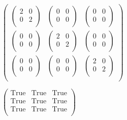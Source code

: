 \documentclass{article}
\begin{document}
\begin{doublespace}
\noindent\(\left(
\begin{array}{ccc}
 \left(
\begin{array}{cc}
 2 & 0 \\
 0 & 2 \\
\end{array}
\right) & \left(
\begin{array}{cc}
 0 & 0 \\
 0 & 0 \\
\end{array}
\right) & \left(
\begin{array}{cc}
 0 & 0 \\
 0 & 0 \\
\end{array}
\right) \\
 \left(
\begin{array}{cc}
 0 & 0 \\
 0 & 0 \\
\end{array}
\right) & \left(
\begin{array}{cc}
 2 & 0 \\
 0 & 2 \\
\end{array}
\right) & \left(
\begin{array}{cc}
 0 & 0 \\
 0 & 0 \\
\end{array}
\right) \\
 \left(
\begin{array}{cc}
 0 & 0 \\
 0 & 0 \\
\end{array}
\right) & \left(
\begin{array}{cc}
 0 & 0 \\
 0 & 0 \\
\end{array}
\right) & \left(
\begin{array}{cc}
 2 & 0 \\
 0 & 2 \\
\end{array}
\right) \\
\end{array}
\right)\)
\end{doublespace}

\begin{doublespace}
\noindent\(\left(
\begin{array}{ccc}
 \text{True} & \text{True} & \text{True} \\
 \text{True} & \text{True} & \text{True} \\
 \text{True} & \text{True} & \text{True} \\
\end{array}
\right)\)
\end{doublespace}
\end{document}
